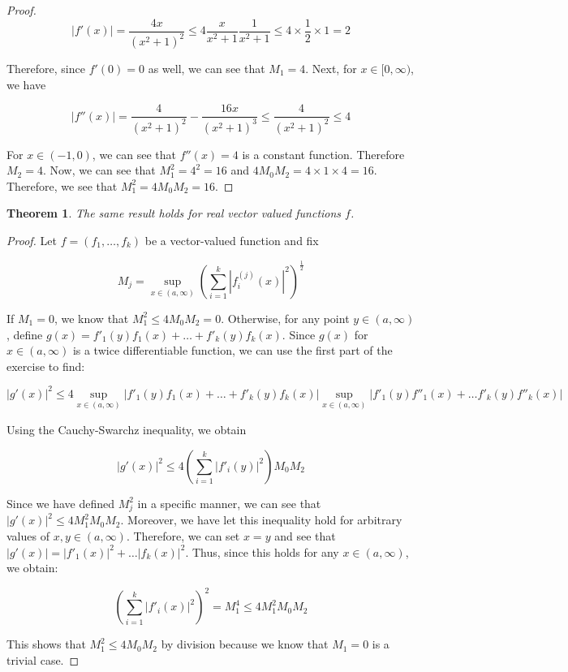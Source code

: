 \documentclass[psamsfonts]{amsart}
\newtheorem{thm}{Theorem}[section]
\theoremstyle{definition}
\theoremstyle{remark}
\numberwithin{equation}{section}
\begin{document}
\begin{proof}
\begin{equation}
|f'(x)| = \frac{4x}{(x^2 +1)^2} \leq 4 \frac{x}{x^2 +1} \frac{1}{x^2 + 1}  \leq 4 \times \frac{1}{2} \times 1 = 2
\end{equation}

Therefore, since $f'(0) = 0$ as well, we can see that $M_1 = 4$. Next, for $ x \in[0,\infty)$, we have

\begin{equation}
|f''(x)| = \frac{4}{(x^2 + 1)^2} - \frac{16x}{(x^2+1)^3} \leq \frac{4}{(x^2 + 1)^2} \leq 4
\end{equation}

For $x \in (-1,0)$, we can see that $f''(x) = 4$ is a constant function. Therefore $M_2 = 4$. Now, we can see that $M_1^2 = 4^2 = 16$ and $4 M_0 M_2 = 4 \times 1 \times 4 = 16$. Therefore, we see that $M_1^2 = 4 M_0 M_2 = 16$.
\end{proof}

\begin{thm}
The same result holds for real vector valued functions $f$.
\end{thm}

\begin{proof}
Let $f = (f_1, \ldots, f_k)$ be a vector-valued function and fix 

\begin{equation}
M_j = \sup_{x \in (a, \infty)} \left( \sum_{i=1}^k |f_i^{(j)} (x)|^2 \right)^{\frac{1}{2}}
\end{equation}

If $M_1 = 0$, we know that $M_1^2 \leq 4 M_0 M_2 = 0$. Otherwise, for any point $y \in (a,\infty)$, define $g(x) = f'_1(y) f_1(x) + \ldots + f'_k(y) f_k(x)$. Since $g(x)$ for $x \in (a,\infty)$ is a twice differentiable function, we can use the first part of the exercise to find:

\begin{equation}
|g'(x)|^2 \leq 4 \sup_{x \in (a, \infty)} |f'_1(y) f_1(x) + \ldots + f'_k(y) f_k(x)| \sup_{x \in (a, \infty)} |f'_1(y) f''_1(x) + \ldots f'_k(y) f''_k(x) | 
\end{equation}

Using the Cauchy-Swarchz inequality, we obtain

\begin{equation}
|g'(x)|^2 \leq 4 \left( \sum_{i = 1}^k |f'_i(y)|^2 \right) M_0 M_2 
\end{equation}

Since we have defined $M_j^2$ in a specific manner, we can see that $|g'(x)|^2 \leq 4 M_1^2 M_0 M_2$. Moreover, we have let this inequality hold for arbitrary values of $x,y \in (a,\infty)$. Therefore, we can set $x = y$ and see that $|g'(x)| = |f'_1(x)|^2 + \ldots |f_k(x)|^2$. Thus, since this holds for any $x \in (a, \infty)$, we obtain:

\begin{equation}
\left( \sum_{i = 1}^k |f'_i(x)|^2 \right)^2 = M_1 ^4 \leq 4 M_1^2 M_0 M_2
\end{equation}

This shows that $M_1^2 \leq 4 M_0 M_2$ by division because we know that $M_1 = 0$ is a trivial case. 
\end{proof}
\end{document}
